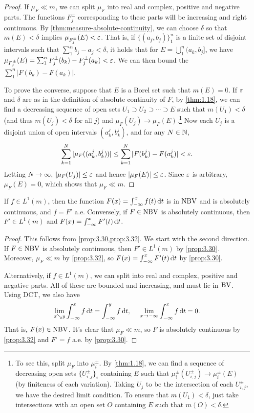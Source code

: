 \documentclass[12pt]{article} %
\begin{document}
\begin{proof}
    If $\mu_F \ll m$, we can split $\mu_F$ into real and complex, positive and negative parts. The functions $F_{j}^{\pm}$ corresponding to these parts will be increasing and right continuous. By \cref{thm:measure-absolute-continuity}, we can choose $\delta$ so that $m(E) < \delta$ implies $\mu_{F_j^{\pm}}(E) < \varepsilon$. That is, if $\{(a_j, b_j)\}_1^n$ is a finite set of disjoint intervals such that $\sum_1^n b_j - a_j < \delta$, it holds that for $E = \bigcup_1^n (a_k, b_j]$, we have $\mu_{F_j^\pm}(E) = \sum_1^n F_j^\pm(b_k) - F_j^\pm(a_k) < \varepsilon$. We can then bound the $\sum_1^n |F(b_k) - F(a_k)|$.

    To prove the converse, suppose that $E$ is a Borel set such that $m(E) = 0$. If $\varepsilon$ and $\delta$ are as in the definition of absolute continuity of $F$, by \cref{thm:1.18}, we can find a decreasing sequence of open sets $U_1 \supset U_2 \supset \cdots \supset E$ such that $m(U_1) < \delta$ (and thus $m(U_j) < \delta$ for all $j$) and $\mu_F(U_j) \to \mu_F(E)$.\footnote{To see this, split $\mu_F$ into $\mu_{i}^{\pm}$. By \cref{thm:1.18}, we can find a sequence of decreasing open sets $\{U_{i, j}^{\pm}\}_i$ containing $E$ such that $\mu_{i}^{\pm}(U_{i, j}^{\pm}) \to \mu_i^{\pm}(E)$ (by finiteness of each variation). Taking $U_j$ to be the intersection of each $U_{i, j}^\pm$, we have the desired limit condition. To ensure that $m(U_1) < \delta$, just take intersections with an open set $O$ containing $E$ such that $m(O) < \delta$.} Now each $U_j$ is a disjoint union of open intervals $(a_k^j, b_k^j)$, and for any $N \in \mathbb{N}$, \[\sum_{k=1}^{N} |\mu_F((a_k^j, b_k^j))| \leq \sum_{k=1}^N |F(b_k^j) - F(a_k^j)| < \varepsilon.\] Letting $N \to \infty$, $|\mu_F(U_j)| \leq \varepsilon$ and hence $|\mu_F(E)| \leq \varepsilon$. Since $\varepsilon$ is arbitrary, $\mu_F(E) = 0$, which shows that $\mu_F \ll m$.
\end{proof}

\begin{corollary}\label{cor:3.33}
    If $f \in L^1(m)$, then the function $F(x) = \int_{-\infty}^x f(t)\, \mathrm{d} t$ is in $\operatorname{NBV}$ and is absolutely continuous, and $f = F'$ a.e. Conversely, if $F \in \operatorname{NBV}$ is absolutely continuous, then $F' \in L^1(m)$ and $F(x) = \int_{-\infty}^{x}F'(t) \, \mathrm{d} t$.
\end{corollary}

\begin{proof}
    This follows from \cref{prop:3.30,prop:3.32}. We start with the second direction. If $F \in \operatorname{NBV}$ is absolutely continuous, then $F' \in L^1(m)$ by \cref{prop:3.30}. Moreover, $\mu_F \ll m$ by \cref{prop:3.32}, so $F(x) = \int_{-\infty}^x F'(t) \, \mathrm{d} t$ by \cref{prop:3.30}.
    
    Alternatively, if $f \in L^1(m)$, we can split into real and complex, positive and negative parts. All of these are bounded and increasing, and must lie in $\operatorname{BV}$. Using DCT, we also have \[\lim_{x \searrow y} \int_{-\infty}^x f \, \mathrm{d} t = \int_{-\infty}^y f \, \mathrm{d} t, \ \ \ \ \lim_{x \to -\infty} \int_{-\infty}^x f \, \mathrm{d} t = 0.\] That is, $F(x) \in \operatorname{NBV}$. It's clear that $\mu_F \ll m$, so $F$ is absolutely continuous by \cref{prop:3.32} and $F' = f$ a.e. by \cref{prop:3.30}.
\end{proof}
\end{document}

